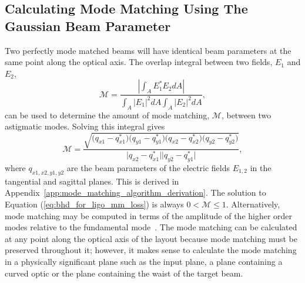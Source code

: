 \subsection{Calculating Mode Matching Using The Gaussian Beam Parameter}
Two perfectly mode matched beams will have identical beam parameters at the same point along the optical axis. The overlap integral between two fields, $E_1$ and $E_2$,
\begin{equation}
\mathcal{M} = \frac{\left|\int_{A} E_1^*E_2 dA \right|}{\int_{A} \left|E_1 \right|^2 dA \int_{A} \left|E_2 \right|^2 dA},
\label{eq:bhd_for_ligo_mode_matching_general}
\end{equation}
can be used to determine the amount of mode matching, $\mathcal{M}$, between two astigmatic modes. Solving this integral gives
\begin{equation}
\mathcal{M} =\frac{\sqrt{\big(q_{x1}-q_{x1}^*\big)\big(q_{y1}-q_{y1}^*\big)\big(q_{x2}-q_{x2}^*\big)\big(q_{y2}-q_{y2}^*\big)}}{\big|q_{x2} - q_{x1}^*\big|\big|q_{y2} - q_{y1}^*\big|},
\label{eq:bhd_for_ligo_mm_loss}
\end{equation}
where $q_{x1,x2,y1,y2}$ are the beam parameters of the electric fields $E_{1,2}$ in the tangential and sagittal planes. This is derived in Appendix~\ref{app:mode_matching_algorithm_derivation}. The solution to Equation (\ref{eq:bhd_for_ligo_mm_loss}) is always $0<\mathcal{M} \leq 1$. Alternatively, mode matching may be computed in terms of the amplitude of the higher order modes relative to the fundamental mode~\cite{Bayer-Helms1984}. The mode matching can be calculated at any point along the optical axis of the layout because mode matching must be preserved throughout it; however, it makes sense to calculate the mode matching in a physically significant plane such as the input plane, a plane containing a curved optic or the plane containing the waist of the target beam.

